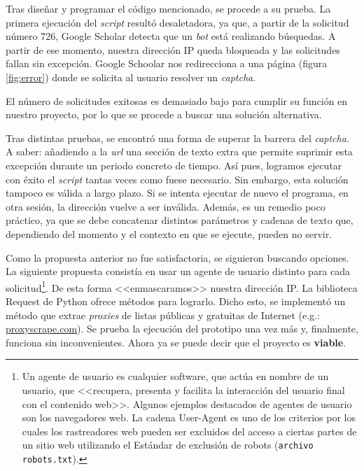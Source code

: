 
Tras diseñar y programar el código mencionado, se procede a su prueba. La primera ejecución del \textit{script} resultó desaletadora, ya que, a partir de la solicitud número 726, Google Scholar detecta que un \textit{bot} está realizando búsquedas. A partir de ese momento, nuestra dirección IP queda bloqueada y las solicitudes fallan sin excepción. Google Schoolar nos redirecciona a una página (figura \ref{fig:error}) donde se solicita al usuario resolver un \textit{captcha}. 


El número de solicitudes exitosas es demasiado bajo para cumplir su función en nuestro proyecto, por lo que se procede a buscar una solución alternativa. 

Tras distintas pruebas, se encontró una forma de superar la barrera del \textit{captcha}. A saber: añadiendo a la \textit{url} una sección de texto extra que permite suprimir esta excepción durante un periodo concreto de tiempo. Así pues, logramos ejecutar con éxito el \textit{script} tantas veces como fuese necesario. Sin embargo, esta solución tampoco es válida a largo plazo. Si se intenta ejecutar de nuevo el programa, en otra sesión, la dirección vuelve a ser inválida. Además, es un remedio poco práctico, ya que se debe concatenar distintos parámetros y cadenas de texto que, dependiendo del momento y el contexto en que se ejecute, pueden no servir.

Como la propuesta anterior no fue satisfactoria, se siguieron buscando opciones. La siguiente propuesta consistía en usar un agente de usuario distinto para cada solicitud\footnote{Un agente de usuario es cualquier software, que actúa en nombre de un usuario, que <<recupera, presenta y facilita la interacción del usuario final con el contenido web>>. Algunos ejemplos destacados de agentes de usuario son los navegadores web. La cadena User-Agent es uno de los criterios por los cuales los rastreadores web pueden ser excluidos del acceso a ciertas partes de un sitio web utilizando el Estándar de exclusión de robots (\texttt{archivo robots.txt}).}. De esta forma <<enmascaramos>> nuestra dirección IP. La biblioteca Request de Python ofrece métodos para lograrlo. Dicho esto, se implementó un método que extrae \textit{proxies} de listas públicas y gratuitas de Internet (e.g.: \href{https://www.proxyscrape.com/free-proxy-list}{proxyscrape.com}). Se prueba la ejecución del prototipo una vez más y, finalmente, funciona sin inconvenientes. Ahora ya se puede decir que el proyecto es \textbf{viable}.


